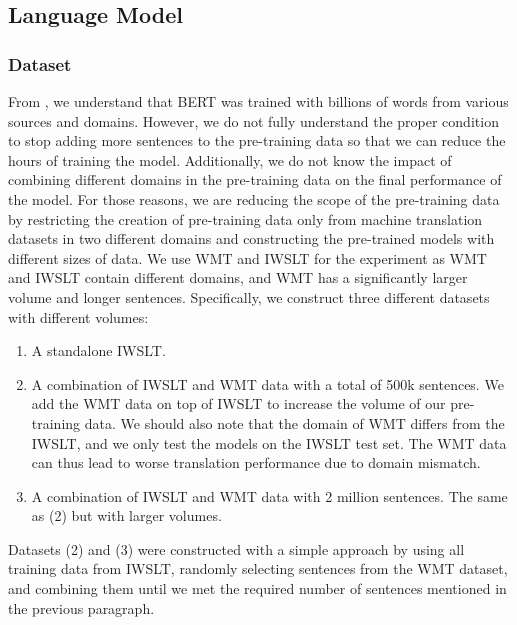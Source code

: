 \subsection{Language Model}
\label{ssec:langmodel}
\subsubsection{Dataset}
From \cite{devlin2018bert}, we understand that BERT was trained with billions of words from various sources and domains. However, we do not fully understand the proper condition to stop adding more sentences to the pre-training data so that we can reduce the hours of training the model. Additionally, we do not know the impact of combining different domains in the pre-training data on the final performance of the model. For those reasons, we are reducing the scope of the pre-training data by restricting the creation of pre-training data only from machine translation datasets in two different domains and constructing the pre-trained models with different sizes of data. We use WMT and IWSLT for the experiment as WMT and IWSLT contain different domains, and WMT has a significantly larger volume and longer sentences. Specifically, we construct three different datasets with different volumes:
\begin{enumerate}
    \item A standalone IWSLT.
    \item A combination of IWSLT and WMT data with a total of 500k sentences. We add the WMT data on top of IWSLT to increase the volume of our pre-training data. We should also note that the domain of WMT differs from the IWSLT, and we only test the models on the IWSLT test set. The WMT data can thus lead to worse translation performance due to domain mismatch.
    \item A combination of IWSLT and WMT data with 2 million sentences. The same as (2) but with larger volumes.
\end{enumerate}

Datasets (2) and (3) were constructed with a simple approach by using all training data from IWSLT, randomly selecting sentences from the WMT dataset, and combining them until we met the required number of sentences mentioned in the previous paragraph.

